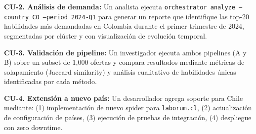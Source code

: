 \textbf{CU-2. Análisis de demanda:} Un analista ejecuta \texttt{orchestrator analyze --country CO --period 2024-Q1} para generar un reporte que identifique las top-20 habilidades más demandadas en Colombia durante el primer trimestre de 2024, segmentadas por clúster y con visualización de evolución temporal.

\textbf{CU-3. Validación de pipeline:} Un investigador ejecuta ambos pipelines (A y B) sobre un subset de 1,000 ofertas y compara resultados mediante métricas de solapamiento (Jaccard similarity) y análisis cualitativo de habilidades únicas identificadas por cada método.

\textbf{CU-4. Extensión a nuevo país:} Un desarrollador agrega soporte para Chile mediante: (1) implementación de nuevo spider para \texttt{laborum.cl}, (2) actualización de configuración de países, (3) ejecución de pruebas de integración, (4) despliegue con zero downtime.
